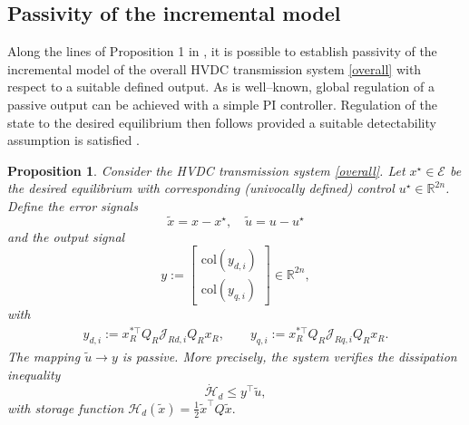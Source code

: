 \documentclass[5p,twocolumn]{elsarticle}
\def\begequ{\begin{equation}}
\def\endequ{\end{equation}}
\def\lab{\label}
\newtheorem{proposition}[theorem]{Proposition}
\numberwithin{equation}{section}
\begin{document}
\subsection{Passivity of the incremental model}
\label{PBcontrol}
Along the lines of Proposition 1 in \cite{HERetal}, it is possible to establish passivity of the incremental model of the overall HVDC transmission system \eqref{overall} with respect to a suitable defined
output. As is well--known, global regulation of a passive output can be achieved with a simple PI controller. Regulation of the state to the desired equilibrium then follows provided a suitable detectability
assumption is satisfied \cite{VAN}.\smallbreak

\begin{proposition}\em
Consider the HVDC transmission system \eqref{overall}. Let $x^\star  \in\mathcal{E}$ be the desired equilibrium with corresponding (univocally defined) control $u^\star \in\mathbb{R}^{2n}$. Define the error signals
\begequ
\lab{tilxu}
\tilde x = x-x^\star ,\quad \tilde u = u - u^\star
\endequ
and the output signal
\begequ\label{y}
 y:=\begin{bmatrix}
\mathrm{col}(y_{d,i})\\
\mathrm{col}(y_{q,i})
\end{bmatrix}\in\mathbb{R}^{2n},
\endequ
with
\begin{equation*}
\begin{aligned}
y_{d,i}:=x_R^{*\top} Q_{R}\mathcal{J}_{Rd,i}Q_{R}x_{R},\qquad y_{q,i}:=x_R^{*\top} Q_{R}\mathcal{J}_{Rq,i}Q_{R}x_{R}.
\end{aligned}
\end{equation*}
The mapping $\tilde u \to y$ is {\em passive}. More precisely, the system verifies the dissipation inequality
\begin{equation}
\lab{dothd}
\dot{\mathcal{H}}_{d}\leq y^\top \tilde u,
\end{equation}
with storage function
$
\mathcal{H}_{d}(\tilde x)=\frac{1}{2}\tilde x^\top Q \tilde x.$
\end{proposition}
\end{document}
